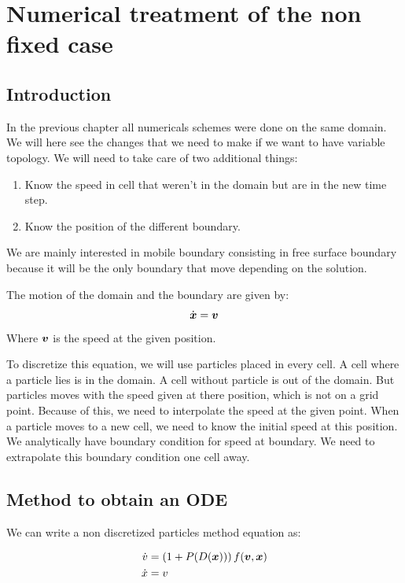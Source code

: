 \chapter{Numerical treatment of the non fixed case }
\minitoc
\section{Introduction}
In the previous chapter all numericals schemes were done on the same domain.
We will here see the changes that we need to make if we want to have variable topology.
We will need to take care of two additional things:
\begin{enumerate}
\item Know the speed in cell that weren't in the domain but are in the new time step.
\item Know the position of the different boundary.
\end{enumerate}

We are mainly interested in mobile boundary consisting in free surface boundary because it will be the only
boundary that move depending on the solution.

The motion of the domain and the boundary are given by:
\begin{equation}
\dot{{\boldsymbol {x}}}={\boldsymbol {v}}
\end{equation}
Where ${\boldsymbol {v}}$ is the speed at the given position.

To discretize this equation, we will use particles  placed in every cell. A cell where a particle lies is in the domain.
A cell without particle is out of the domain.
But particles moves with the speed given at there position, which is not on a grid point.
Because of this, we need to interpolate the speed at the given point.
When a particle moves to a new cell, we need to know the initial speed at this position.
We analytically have boundary condition for speed at boundary.
We need to extrapolate this boundary condition one cell away.

\section{Method to obtain an ODE}

We can write a non discretized particles method equation as:

\begin{align*}
	\dot{v}&=\left(1 + P(D({\boldsymbol {x}}))\right)f({\boldsymbol {v}},{\boldsymbol {x}})\\
	\dot{x}&=v
\end{align*}

